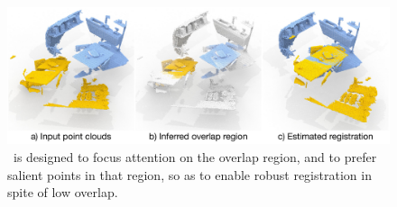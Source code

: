 \begin{figure}[t]
    \centering
    \includegraphics[width=1.0\columnwidth]{figures/images/teaser.pdf}
    \caption{\acro\ is designed to focus attention on the overlap region, and to prefer salient points in that region, so as to enable robust registration in spite of low overlap.}
    \label{fig:teaser_image}
\end{figure}